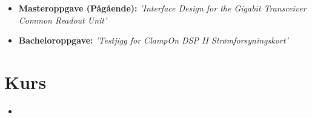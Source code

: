 \documentclass[11pt,a4paper,sans,norsk]{moderncv}        %
\begin{document}
\begin{itemize}

\item{\textbf{Masteroppgave (Pågående):} \textit{'Interface Design for the Gigabit Transceiver Common Readout Unit'}


}
\vspace{6pt}

\item{\textbf{Bacheloroppgave:} \textit{'Testjigg for ClampOn DSP II Strømforsyningskort'}


}
\end{itemize}


\section{Kurs}
\begin{itemize}
\item{}
\end{itemize}
\end{document}
